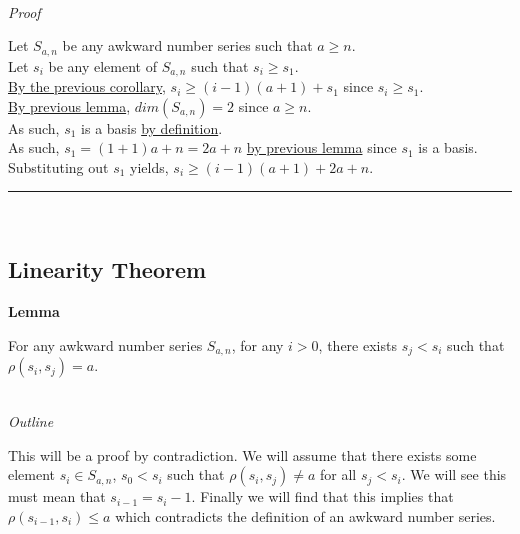 \documentclass[a4paper,12pt]{article}
\begin{document}
\noindent \\
\textit{Proof}

\noindent Let $S_{a, n}$ be any awkward number series such that $a \geq n$.\\

\noindent Let $s_i$ be any element of $S_{a, n}$ such that $s_i \geq s_1$.\\

\noindent \hyperlink{corollary:min_length_one_staple_pt2}{By the previous corollary}, $s_i \geq (i - 1)(a + 1) + s_1$ since $s_i \geq s_1$.\\

\noindent \hyperlink{lemma:dimension_a_greater_equal_n}{By previous lemma}, $dim(S_{a, n}) = 2$ since $a \geq n$.\\

\noindent As such, $s_1$ is a basis \hyperlink{definition:basis}{by definition}.\\

\noindent As such, $s_1 = (1 + 1)a + n = 2a + n$ \hyperlink{lemma:basis_lengths}{by previous lemma} since $s_1$ is a basis.\\

\noindent Substituting out $s_1$ yields, $s_i \geq (i - 1)(a + 1) + 2a + n$.


\begin{center}
\noindent\rule{8cm}{0.4pt}
\end{center}
\noindent \\


\subsection{Linearity Theorem}



\label{lemma:relation_to_other}
\hypertarget{lemma:relation_to_other}{}
\begin{tcolorbox}
\textbf{Lemma}

For any awkward number series $S_{a,n}$, for any $i > 0$, there exists $s_j < s_i$ such that $\rho(s_i, s_j) = a$.

\end{tcolorbox}

\noindent \\
\textit{Outline}

\noindent This will be a proof by contradiction. We will assume that there exists some element $s_i \in S_{a,n}$, $s_0 < s_i$ such that $\rho(s_i, s_j) \neq a$ for all $s_j < s_i$. We will see this must mean that $s_{i - 1} = s_i - 1$. Finally we will find that this implies that $\rho(s_{i - 1}, s_i) \leq a$ which contradicts the definition of an awkward number series.
\end{document}
